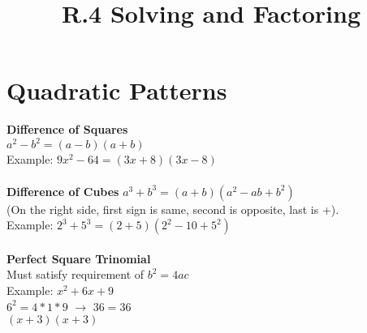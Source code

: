 \documentclass{article}
\begin{document}
	
	\setlength{\droptitle}{-5em}
	\title{R.4 Solving and Factoring}
	\date{}
	\author{}
	\maketitle
	
		\section*{Quadratic Patterns}
	\textbf{Difference of Squares} \\
	$a^2 - b^2 = (a-b)(a+b)$ \\
	Example: $9x^2 -64 = (3x + 8 )(3x-8)$ \\ \\
	\textbf{Difference of Cubes}\newline
	$a^3 + b^3 = (a+b)(a^2 - ab +b^2)$\\
	(On the right side, first sign is same, second is opposite, last is +). \\
	Example: $2^3 + 5^3 = (2 + 5)(2^2 - 10 + 5^2)$ \\
	\\
	\textbf{Perfect Square Trinomial} \\
	Must satisfy requirement of $b^2=4ac$ \\
	Example: $x^2+6x+9$ \\
	$6^2 = 4*1*9$ $\rightarrow$ $36=36$ \\
	$(x+3)(x+3)$ 
\end{document}
